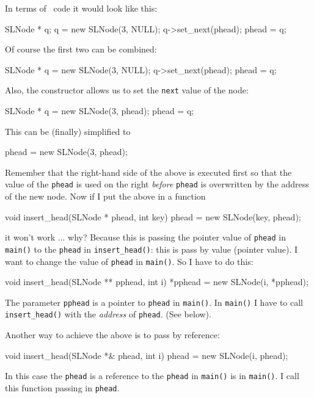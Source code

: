 In terms of \cpp\ code it would look like this:
\begin{console}[frame=single,fontsize=\footnotesize]
SLNode * q;
q = new SLNode(3, NULL);
q->set_next(phead);
phead = q;
\end{console}
Of course the first two can be combined:
\begin{console}[frame=single]
SLNode * q = new SLNode(3, NULL);
q->set_next(phead);
phead = q;
\end{console}
Also, the constructor allows us to set the \verb!next! value of the node:
\begin{console}[frame=single,fontsize=\footnotesize]
SLNode * q = new SLNode(3, phead);
phead = q;
\end{console}
This can be (finally) simplified to
\begin{console}[frame=single,fontsize=\footnotesize]
phead = new SLNode(3, phead);
\end{console}
Remember that the right-hand side of the above is executed first
so that the value of the \verb!phead! is
used on the right \textit{before}
\verb!phead! is overwritten by the address of the new node.
Now if I put the above in a function
\begin{console}[frame=single,fontsize=\footnotesize]
void insert_head(SLNode * phead, int key)
{
    phead = new SLNode(key, phead);
}
\end{console}
it won't work ... why?
Because this is passing the pointer value of \verb!phead!
in \verb!main()! to the \verb!phead! in \verb!insert_head()!:
this is pass by value (pointer value).
I want to change the value of \verb!phead! in \verb!main()!.
So I have to do this:
\begin{console}[frame=single,fontsize=\footnotesize]
void insert_head(SLNode ** pphead, int i)
{
    *pphead = new SLNode(i, *pphead);
}
\end{console}
The parameter \verb!pphead! is a pointer to \verb!phead! in
\verb!main()!.
In \verb!main()! I have to call \verb!insert_head()!
with the \textit{address} of \verb!phead!. (See below).

Another way to achieve the above is to pass by reference:
\begin{console}[frame=single,fontsize=\footnotesize]
void insert_head(SLNode *& phead, int i)
{
    phead = new SLNode(i, phead);
}
\end{console}
In this case the \verb!phead! is a reference to the
\verb!phead! in \verb!main()! is in \verb!main()!.
I call this function passing in \verb!phead!.


